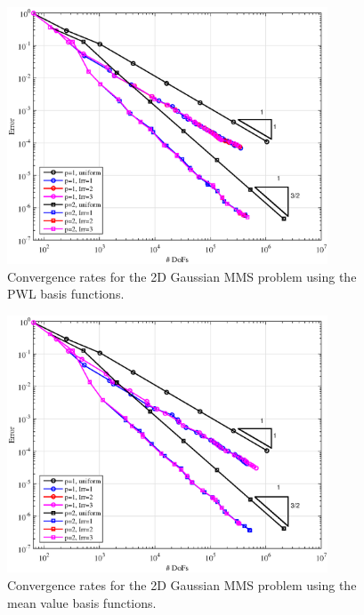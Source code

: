 \begin{figure}
\centering
\includegraphics[width=0.85\textwidth]{figures/sec_BF/TransportMMS_Gauss2D_PWL_Err.eps}
\caption{Convergence rates for the 2D Gaussian MMS problem using the PWL basis functions.}
\label{fig::BF_Results_MMS_Gauss2D_cart}
\end{figure}

\begin{figure}
\centering
\includegraphics[width=0.85\textwidth]{figures/sec_BF/TransportMMS_Gauss2D_MV_Err.eps}
\caption{Convergence rates for the 2D Gaussian MMS problem using the mean value basis functions.}
\label{fig::BF_Results_MMS_Gauss2D_tri}
\end{figure}

